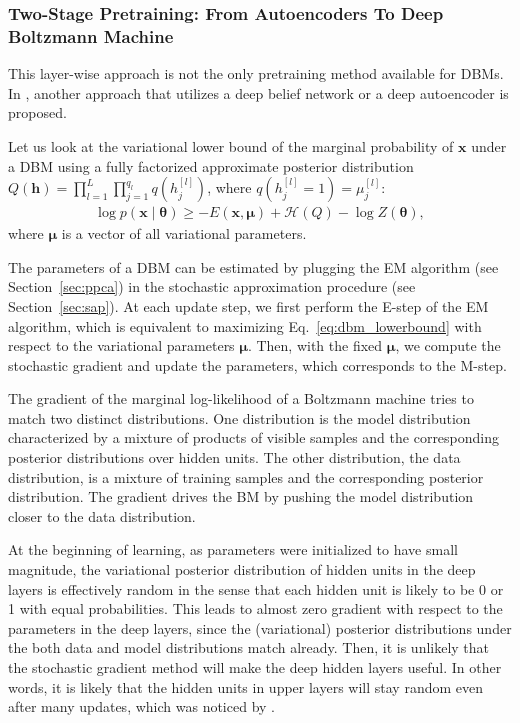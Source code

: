 \documentclass{now}
\newcommand{\qlay}[1]{\left[#1\right]}
\newcommand{\vect}[1]{\mathbf{#1}}
\newcommand{\vects}[1]{\boldsymbol{#1}}
\newcommand{\vh}[0]{\vect{h}}
\newcommand{\vx}[0]{\vect{x}}
\newcommand{\vmu}[0]{\vects{\mu}}
\newcommand{\TT}[0]{{\vects{\theta}}}
\newcommand{\HH}[0]{\mathcal{H}}
\begin{document}
\subsubsection{Two-Stage Pretraining: From Autoencoders To Deep Boltzmann
Machine}

This layer-wise approach is not the only pretraining method available for DBMs.
In \citep{Cho13ICANN}, another approach that utilizes a deep belief network or a
deep autoencoder is proposed.

Let us look at the variational lower bound of the marginal probability of $\vx$
under a DBM using a fully factorized approximate posterior distribution \\
$Q(\vh) = \prod_{l=1}^L
\prod_{j=1}^{q_l} q(h_j^{\qlay{l}})$, where $q(h_j^{\qlay{l}}=1) =
\mu_j^{\qlay{l}}$:
\begin{align}
    \label{eq:dbm_lowerbound}
    \log p(\vx \mid \TT) \geq  -E (\vx, \vmu) + \HH(Q) - \log Z(\TT),
\end{align}
where $\vmu$ is a vector of all variational parameters.

The parameters of a DBM can be estimated by plugging the EM algorithm (see
Section~\ref{sec:ppca}) in the stochastic approximation procedure (see
Section~\ref{sec:sap}). At each update step, we first perform the E-step of the
EM algorithm, which is equivalent to maximizing Eq.~\eqref{eq:dbm_lowerbound}
with respect to the variational parameters $\vmu$. Then, with the fixed $\vmu$,
we compute the stochastic gradient and update the parameters, which corresponds
to the M-step.

The gradient of the marginal log-likelihood of a Boltzmann machine tries to
match two distinct distributions. One distribution is the model distribution
characterized by a mixture of products of visible samples and the corresponding
posterior distributions over hidden units. The other distribution, the data
distribution, is a mixture of training samples and the corresponding posterior
distribution. The gradient drives the BM by pushing the model distribution
closer to the data distribution.

At the beginning of learning, as parameters were initialized to have small
magnitude, the variational posterior distribution of hidden units in the deep
layers is effectively random in the sense that each hidden unit is likely to be
0 or 1 with equal probabilities. This leads to almost zero gradient with respect
to the parameters in the deep layers, since the (variational) posterior
distributions under the both data and model distributions match already. Then,
it is unlikely that the stochastic gradient method will make the deep hidden
layers useful. In other words, it is likely that the hidden units in upper
layers will stay random even after many updates, which was noticed by
\citet{Cho13IJCNN}.
\end{document}
